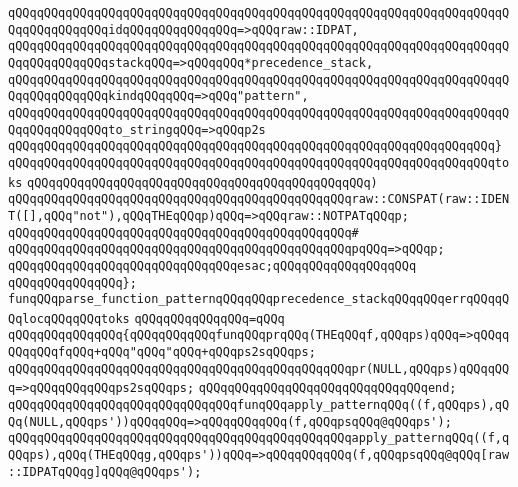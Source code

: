 \verb|qQQqqQQqqQQqqQQqqQQqqQQqqQQqqQQqqQQqqQQqqQQqqQQqqQQqqQQqqQQqqQQqqQQqqQQqqQQqqQQqqQQqidqQQqqQQqqQQqqQQq=>qQQqraw::IDPAT,|\newline
\verb|qQQqqQQqqQQqqQQqqQQqqQQqqQQqqQQqqQQqqQQqqQQqqQQqqQQqqQQqqQQqqQQqqQQqqQQqqQQqqQQqqQQqstackqQQq=>qQQqqQQq*precedence_stack,|\newline
\verb|qQQqqQQqqQQqqQQqqQQqqQQqqQQqqQQqqQQqqQQqqQQqqQQqqQQqqQQqqQQqqQQqqQQqqQQqqQQqqQQqqQQqkindqQQqqQQq=>qQQq"pattern",|\newline
\verb|qQQqqQQqqQQqqQQqqQQqqQQqqQQqqQQqqQQqqQQqqQQqqQQqqQQqqQQqqQQqqQQqqQQqqQQqqQQqqQQqqQQqto_stringqQQq=>qQQqp2s|\newline
\verb|qQQqqQQqqQQqqQQqqQQqqQQqqQQqqQQqqQQqqQQqqQQqqQQqqQQqqQQqqQQqqQQqqQQq}|\newline
\verb|qQQqqQQqqQQqqQQqqQQqqQQqqQQqqQQqqQQqqQQqqQQqqQQqqQQqqQQqqQQqqQQqqQQqtoks|\newline
\verb|qQQqqQQqqQQqqQQqqQQqqQQqqQQqqQQqqQQqqQQqqQQqqQQq)|\newline
\newline
\verb|qQQqqQQqqQQqqQQqqQQqqQQqqQQqqQQqqQQqqQQqqQQqqQQqraw::CONSPAT(raw::IDENT([],qQQq"not"),qQQqTHEqQQqp)qQQq=>qQQqraw::NOTPATqQQqp;|\newline
\verb|qQQqqQQqqQQqqQQqqQQqqQQqqQQqqQQqqQQqqQQqqQQqqQQq#|\newline
\verb|qQQqqQQqqQQqqQQqqQQqqQQqqQQqqQQqqQQqqQQqqQQqqQQqpqQQq=>qQQqp;|\newline
\verb|qQQqqQQqqQQqqQQqqQQqqQQqqQQqqQQqesac;qQQqqQQqqQQqqQQqqQQq|\newline
\verb|qQQqqQQqqQQqqQQq};|\newline
\newline
\verb|funqQQqparse_function_patternqQQqqQQqprecedence_stackqQQqqQQqerrqQQqqQQqlocqQQqqQQqtoks|\newline
\verb|qQQqqQQqqQQqqQQq=qQQq|\newline
\verb|qQQqqQQqqQQqqQQq{qQQqqQQqqQQqfunqQQqprqQQq(THEqQQqf,qQQqps)qQQq=>qQQqqQQqqQQqfqQQq+qQQq"qQQq"qQQq+qQQqps2sqQQqps;|\newline
\verb|qQQqqQQqqQQqqQQqqQQqqQQqqQQqqQQqqQQqqQQqqQQqqQQqpr(NULL,qQQqps)qQQqqQQq=>qQQqqQQqqQQqps2sqQQqps;|\newline
\verb|qQQqqQQqqQQqqQQqqQQqqQQqqQQqqQQqend;|\newline
\newline
\verb|qQQqqQQqqQQqqQQqqQQqqQQqqQQqqQQqfunqQQqapply_patternqQQq((f,qQQqps),qQQq(NULL,qQQqps'))qQQqqQQq=>qQQqqQQqqQQq(f,qQQqpsqQQq@qQQqps');|\newline
\verb|qQQqqQQqqQQqqQQqqQQqqQQqqQQqqQQqqQQqqQQqqQQqqQQqapply_patternqQQq((f,qQQqps),qQQq(THEqQQqg,qQQqps'))qQQq=>qQQqqQQqqQQq(f,qQQqpsqQQq@qQQq[raw::IDPATqQQqg]qQQq@qQQqps');|\newline
